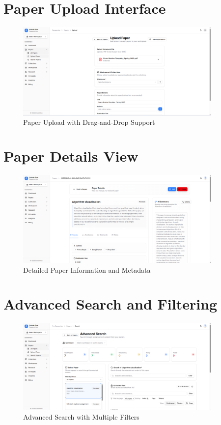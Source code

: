 \section{Paper Upload Interface}

\begin{figure}[H]
\centering
\includegraphics[width=0.9\textwidth]{images/screenshots/paper_upload.png}
\caption{Paper Upload with Drag-and-Drop Support}
\label{fig:ss-upload}
\end{figure}

\section{Paper Details View}

\begin{figure}[H]
\centering
\includegraphics[width=0.9\textwidth]{images/screenshots/paper_details_1.png}
\caption{Detailed Paper Information and Metadata}
\label{fig:ss-details}
\end{figure}

\section{Advanced Search and Filtering}

\begin{figure}[H]
\centering
\includegraphics[width=0.9\textwidth]{images/screenshots/advanced_search.png}
\caption{Advanced Search with Multiple Filters}
\label{fig:ss-search}
\end{figure}

